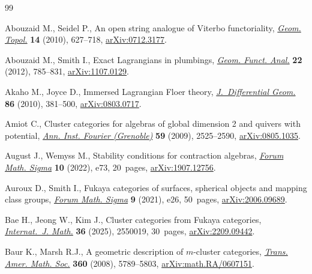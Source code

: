\begin{thebibliography}{99}
\footnotesize\itemsep=0pt

Abouzaid M., Seidel P., An open string analogue of {V}iterbo functoriality,
 \href{https://doi.org/10.2140/gt.2010.14.627}{\textit{Geom. Topol.}}
 \textbf{14} (2010), 627--718,
 \href{http://arxiv.org/abs/0712.3177}{arXiv:0712.3177}.

Abouzaid M., Smith I., Exact {L}agrangians in plumbings,
 \href{https://doi.org/10.1007/s00039-012-0162-y}{\textit{Geom. Funct. Anal.}}
 \textbf{22} (2012), 785--831,
 \href{http://arxiv.org/abs/1107.0129}{arXiv:1107.0129}.

Akaho M., Joyce D., Immersed {L}agrangian {F}loer theory,
 \href{https://doi.org/10.4310/jdg/1303219427}{\textit{J.~Differential Geom.}}
 \textbf{86} (2010), 381--500,
 \href{http://arxiv.org/abs/0803.0717}{arXiv:0803.0717}.

Amiot C., Cluster categories for algebras of global dimension 2 and quivers
 with potential, \href{https://doi.org/10.5802/aif.2499}{\textit{Ann. Inst.
 Fourier (Grenoble)}} \textbf{59} (2009), 2525--2590,
 \href{http://arxiv.org/abs/0805.1035}{arXiv:0805.1035}.

August J., Wemyss M., Stability conditions for contraction algebras,
 \href{https://doi.org/10.1017/fms.2022.65}{\textit{Forum Math. Sigma}}
 \textbf{10} (2022), e73, 20~pages,
 \href{http://arxiv.org/abs/1907.12756}{arXiv:1907.12756}.

Auroux D., Smith I., Fukaya categories of surfaces, spherical objects and
 mapping class groups,
 \href{https://doi.org/10.1017/fms.2021.21}{\textit{Forum Math. Sigma}}
 \textbf{9} (2021), e26, 50~pages,
 \href{http://arxiv.org/abs/2006.09689}{arXiv:2006.09689}.

Bae H., Jeong W., Kim J., Cluster categories from {F}ukaya categories,
 \href{https://doi.org/10.1142/S0129167X25500193}{\textit{Internat.~J. Math.}}
 \textbf{36} (2025), 2550019, 30~pages,
 \href{http://arxiv.org/abs/2209.09442}{arXiv:2209.09442}.

Baur K., Marsh R.J., A geometric description of {$m$}-cluster categories,
 \href{https://doi.org/10.1090/S0002-9947-08-04441-3}{\textit{Trans. Amer.
 Math. Soc.}} \textbf{360} (2008), 5789--5803,
 \href{http://arxiv.org/abs/math.RA/0607151}{arXiv:math.RA/0607151}.


\end{thebibliography}
